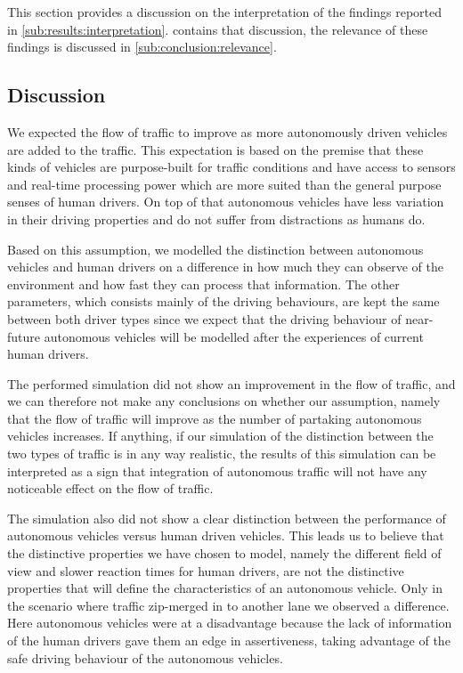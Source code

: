 
This section provides a discussion on the interpretation of the findings reported in \cref{sub:results:interpretation}.  contains that discussion, the relevance of these findings is discussed in \cref{sub:conclusion:relevance}.

\subsection{Discussion}
\label{sub:conclusion:discussion}
We expected the flow of traffic to improve as more autonomously driven vehicles are added to the traffic. This expectation is based on the premise that these kinds of vehicles are purpose-built for traffic conditions and have access to sensors and real-time processing power which are more suited than the general purpose senses of human drivers. On top of that autonomous vehicles have less variation in their driving properties and do not suffer from distractions as humans do.

Based on this assumption, we modelled the distinction between autonomous vehicles and human drivers on a difference in how much they can observe of the environment and how fast they can process that information. The other parameters, which consists mainly of the driving behaviours, are kept the same between both driver types since we expect that the driving behaviour of near-future autonomous vehicles will be modelled after the experiences of current human drivers.

The performed simulation did not show an improvement in the flow of traffic, and we can therefore not make any conclusions on whether our assumption, namely that the flow of traffic will improve as the number of partaking autonomous vehicles increases. If anything, if our simulation of the distinction between the two types of traffic is in any way realistic, the results of this simulation can be interpreted as a sign that integration of autonomous traffic will not have any noticeable effect on the flow of traffic.

The simulation also did not show a clear distinction between the performance of autonomous vehicles versus human driven vehicles. This leads us to believe that the distinctive properties we have chosen to model, namely the different field of view and slower reaction times for human drivers, are not the distinctive properties that will define the characteristics of an autonomous vehicle. Only in the scenario where traffic zip-merged in to another lane we observed a difference. Here autonomous vehicles were at a disadvantage because the lack of information of the human drivers gave them an edge in assertiveness, taking advantage of the safe driving behaviour of the autonomous vehicles.

